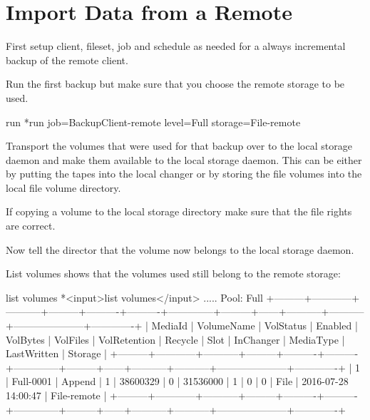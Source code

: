 \section{Import Data from a Remote \bareosSd}


First setup client, fileset, job and schedule as needed for a always incremental backup of the remote client.


Run the first backup but make sure that you choose the remote storage to be used.


\begin{bconsole}{run}
*run job=BackupClient-remote level=Full storage=File-remote
\end{bconsole}



Transport the volumes that were used for that backup over to the local storage daemon and make them available to the local storage daemon.
This can be either by putting the tapes into the local changer or by storing the file volumes into the local file volume directory.

If copying a volume to the local storage directory make sure that the file rights are correct.

Now tell the director that the volume now belongs to the local storage daemon.

List volumes shows that the volumes used still belong to the remote storage:

\begin{bconsole}{list volumes}
*<input>list volumes</input>
.....
Pool: Full
+---------+------------+-----------+---------+----------+----------+--------------+---------+------+-----------+-----------+---------------------+-------------+
| MediaId | VolumeName | VolStatus | Enabled | VolBytes | VolFiles | VolRetention | Recycle | Slot | InChanger | MediaType | LastWritten         | Storage     |
+---------+------------+-----------+---------+----------+----------+--------------+---------+------+-----------+-----------+---------------------+-------------+
| 1       | Full-0001  | Append    | 1       | 38600329 | 0        | 31536000     | 1       | 0    | 0         | File      | 2016-07-28 14:00:47 | File-remote |
+---------+------------+-----------+---------+----------+----------+--------------+---------+------+-----------+-----------+---------------------+-------------+
\end{bconsole}

